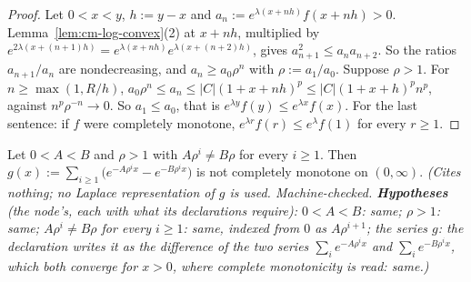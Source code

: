\begin{proof}
\leanok
{}
Let $0 < x < y$, $h := y - x$ and $a_n := e^{\lambda(x + nh)}f(x + nh) > 0$.
Lemma~\ref{lem:cm-log-convex}(2) at $x + nh$, multiplied by
$e^{2\lambda(x + (n+1)h)} = e^{\lambda(x + nh)}e^{\lambda(x + (n+2)h)}$, gives
$a_{n+1}^2 \le a_na_{n+2}$. So the ratios $a_{n+1}/a_n$ are nondecreasing, and
$a_n \ge a_0\rho^n$ with $\rho := a_1/a_0$. Suppose $\rho > 1$. For $n \ge \max(1, R/h)$,
$a_0\rho^n \le a_n \le |C|(1 + x + nh)^p \le |C|(1 + x + h)^pn^p$, against $n^p\rho^{-n} \to 0$. So
$a_1 \le a_0$, that is $e^{\lambda y}f(y) \le e^{\lambda x}f(x)$. For the last sentence: if $f$ were
completely monotone, $e^{\lambda r}f(r) \le e^\lambda f(1)$ for every $r \ge 1$.
\end{proof}

\begin{lemma}
\label{lem:cm-uncancelled-atom}
\leanok
Let $0 < A < B$ and $\rho > 1$ with $A\rho^i \ne B\rho$ for every $i \ge 1$. Then
$g(x) := \sum_{i \ge 1}\bigl(e^{-A\rho^ix} - e^{-B\rho^ix}\bigr)$ is not completely monotone on
$(0, \infty)$.
\statusT\quad\emph{(Cites nothing; no Laplace representation of $g$ is used. Machine-checked.
\textbf{Hypotheses} (the node's, each with what its declarations require): $0 < A < B$: same;
$\rho > 1$: same; $A\rho^i \ne B\rho$ for every $i \ge 1$: same, indexed from $0$ as
$A\rho^{i+1}$; the series $g$: the declaration writes it as the difference of the two series
$\sum_ie^{-A\rho^ix}$ and $\sum_ie^{-B\rho^ix}$, which both converge for $x > 0$, where complete
monotonicity is read: same.)}
\end{lemma}

